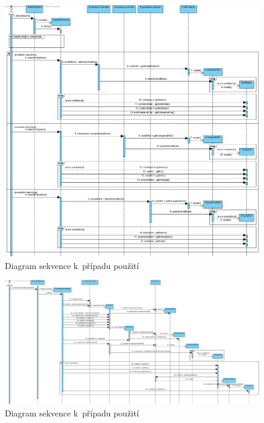 \begin{figure}[H]
	\begin{center}
		\includegraphics[width=16cm,keepaspectratio]{include/seq_search}
	\end{center}
	\caption{Diagram sekvence k~případu použití }
	\label{fig:SeqSearch}
\end{figure}

\pagebreak

\begin{landscape}
\begin{figure}[H]
	\begin{center}
		\includegraphics[width=25cm,keepaspectratio]{include/seq_read_own_contract}
	\end{center}
	\caption{Diagram sekvence k~případu použití }
	\label{fig:SeqReadOwnContract}
\end{figure}
\end{landscape}


